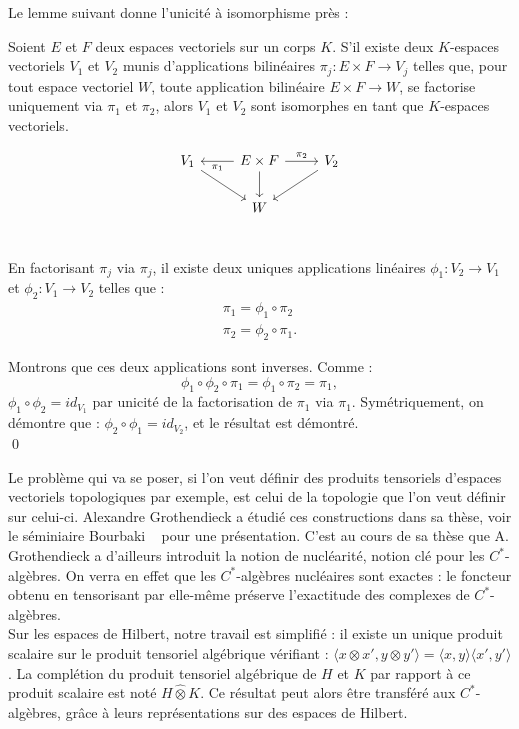 Le lemme suivant donne l'unicité à isomorphisme près :

\begin{lem}
Soient $E$ et $F$ deux espaces vectoriels sur un corps $K$. S'il existe deux $K$-espaces vectoriels $V_1$ et $V_2$ munis d'applications bilinéaires $\pi_j : E\times F \rightarrow V_j$ telles que, pour tout espace vectoriel $W$, toute application bilinéaire $E\times F \rightarrow W$,  se factorise uniquement via $\pi_1$ et $\pi_2$, alors $V_1$ et $V_2$ sont isomorphes en tant que $K$-espaces vectoriels.
\end{lem}


\[\begin{tikzcd}
V_1 \arrow{dr}& \arrow{l}{\pi_1}	E\times F \arrow{d}\arrow{r}{\pi_2}	& \arrow{dl}V_2 \\
			 & 		W		&	\\
\end{tikzcd}\]

\begin{dem}
En factorisant $\pi_j$ via $\pi_j$, il existe deux uniques applications linéaires $\phi_1 : V_2\rightarrow V_1$ et $\phi_2 : V_1\rightarrow V_2$ telles que :
\[\begin{array}{c}\pi_1=\phi_1\circ \pi_2 \\ \pi_2=\phi_2\circ \pi_1.\end{array}\]

Montrons que ces deux applications sont inverses. Comme :
\[\phi_1\circ \phi_2 \circ \pi_1 = \phi_1\circ \pi_2 =\pi_1 ,\]
$\phi_1\circ \phi_2 = id_{V_1}$ par unicité de la factorisation de $\pi_1$ via $\pi_1$.
Symétriquement, on démontre que : $\phi_2\circ \phi_1 = id_{V_2}$, et le résultat est démontré.\\
\qed
\end{dem}

Le problème qui va se poser, si l'on veut définir des produits tensoriels d'espaces vectoriels topologiques par exemple, est celui de la topologie que l'on veut définir sur celui-ci. Alexandre Grothendieck a étudié ces constructions dans sa thèse, voir le séminiaire Bourbaki ~\cite{GrothendieckNuc} pour une présentation. C'est au cours de sa thèse que A. Grothendieck a d'ailleurs introduit la notion de nucléarité, notion clé pour les $C^*$-algèbres. On verra en effet que les $C^*$-algèbres nucléaires sont exactes : le foncteur obtenu en tensorisant par elle-même préserve l'exactitude des complexes de $C^*$-algèbres.\\

Sur les espaces de Hilbert, notre travail est simplifié : il existe un unique produit scalaire sur le produit tensoriel algébrique vérifiant : $\langle x\otimes x', y\otimes y'\rangle=\langle x, y\rangle \langle x',y' \rangle$. La complétion du produit tensoriel algébrique de $H$ et $K$ par rapport à ce produit scalaire est noté $H\hat \otimes K$. Ce résultat peut alors être transféré aux $C^*$-algèbres, grâce à leurs représentations sur des espaces de Hilbert. 


